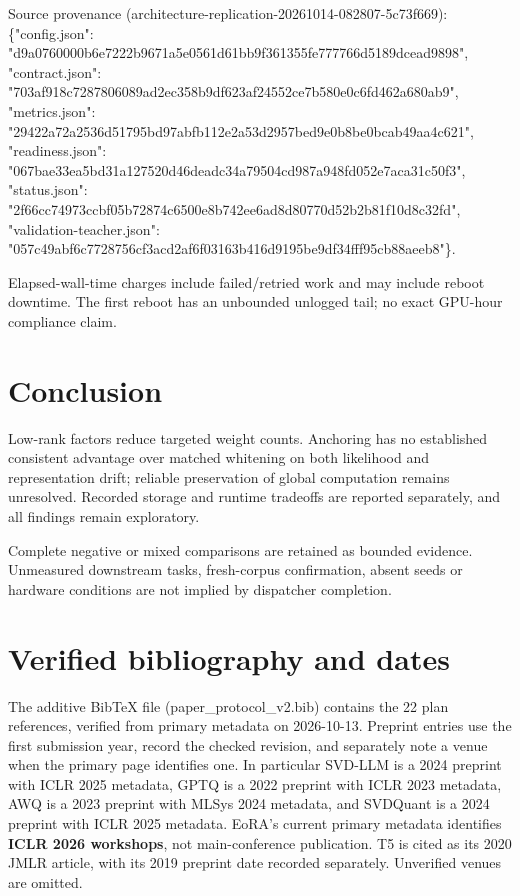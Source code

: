 \documentclass[10pt]{article}
\begin{document}
Source provenance (architecture-replication-20261014-082807-5c73f669): \{"config.json": "d9a0760000b6e7222b9671a5e0561d61bb9f361355fe777766d5189dcead9898", "contract.json": "703af918c7287806089ad2ec358b9df623af24552ce7b580e0c6fd462a680ab9", "metrics.json": "29422a72a2536d51795bd97abfb112e2a53d2957bed9e0b8be0bcab49aa4c621", "readiness.json": "067bae33ea5bd31a127520d46deadc34a79504cd987a948fd052e7aca31c50f3", "status.json": "2f66cc74973ccbf05b72874c6500e8b742ee6ad8d80770d52b2b81f10d8c32fd", "validation-teacher.json": "057c49abf6c7728756cf3acd2af6f03163b416d9195be9df34fff95cb88aeeb8"\}.


Elapsed-wall-time charges include failed/retried work and may include reboot downtime. The first reboot has an unbounded unlogged tail; no exact GPU-hour compliance claim.

\section{Conclusion}

Low-rank factors reduce targeted weight counts. Anchoring has no established consistent advantage over matched whitening on both likelihood and representation drift; reliable preservation of global computation remains unresolved. Recorded storage and runtime tradeoffs are reported separately, and all findings remain exploratory.

Complete negative or mixed comparisons are retained as bounded evidence. Unmeasured downstream tasks, fresh-corpus confirmation, absent seeds or hardware conditions are not implied by dispatcher completion.

\section{Verified bibliography and dates}

The additive BibTeX file (paper\_protocol\_v2.bib) contains the 22 plan references,
verified from primary metadata on 2026-10-13. Preprint entries use the first
submission year, record the checked revision, and separately note a venue when
the primary page identifies one. In particular SVD-LLM is a 2024 preprint with
ICLR 2025 metadata, GPTQ is a 2022 preprint with ICLR 2023 metadata, AWQ is a
2023 preprint with MLSys 2024 metadata, and SVDQuant is a 2024 preprint with ICLR
2025 metadata. EoRA's current primary metadata identifies \textbf{ICLR 2026 workshops},
not main-conference publication. T5 is cited as its 2020 JMLR article, with its
2019 preprint date recorded separately. Unverified venues are omitted.
\end{document}
